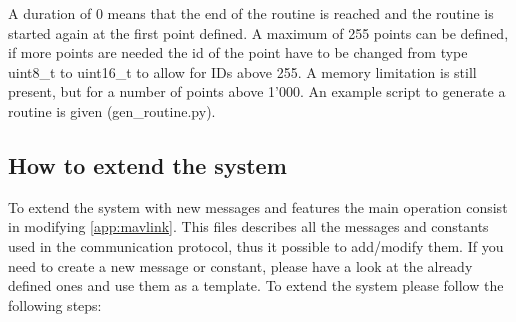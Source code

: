 \documentclass[12pt,a4paper, twoside]{article}
\begin{document}
A duration of 0 means that the end of the routine is reached and the routine is started again at the first point defined. A maximum of 255 points can be defined, if more points are needed the id of the point have to be changed from type uint8\_t to uint16\_t to allow for IDs above 255. A memory limitation is still present, but for a number of points above 1'000. An example script to generate a routine is given (gen\_routine.py).
\subsection{How to extend the system} \label{sec:expand}
To extend the system with new messages and features the main operation consist in modifying \ref{app:mavlink}. This files describes all the messages and constants used in the communication protocol, thus it possible to add/modify them. If you need to create a new message or constant, please have a look at the already defined ones and use them as a template. 
To extend the system please follow the following steps:
\end{document}
